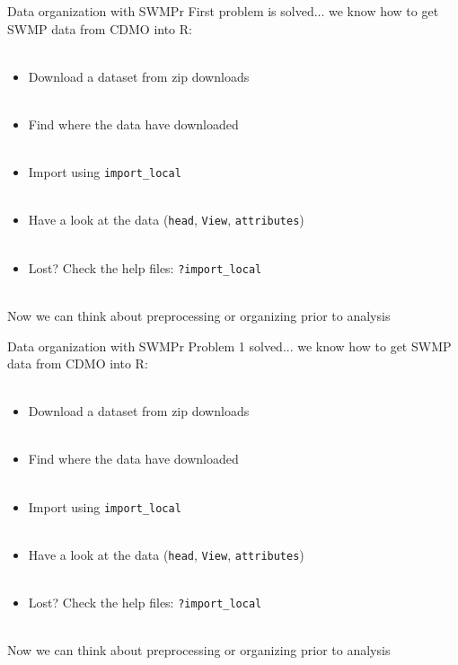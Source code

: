 \documentclass[xcolor=dvipsnames]{beamer}\usepackage[]{graphicx}\usepackage[]{color}
\begin{document}
\begin{frame}[fragile]{Data organization with SWMPr}
First problem is solved... we know how to get SWMP data from CDMO into R: \\~\\
\begin{itemize}
\item Download a dataset from zip downloads \\~\\
\item Find where the data have downloaded \\~\\
\item Import using \texttt{import_local} \\~\\
\item Have a look at the data (\texttt{head}, \texttt{View}, \texttt{attributes}) \\~\\
\item Lost? Check the help files: \texttt{?import\_local}\\~\\
\end{itemize}
Now we can think about preprocessing or organizing prior to analysis
\end{frame}

\begin{frame}[fragile]{Data organization with SWMPr}
Problem 1 solved... we know how to get SWMP data from CDMO into R: \\~\\
\begin{itemize}
\item Download a dataset from zip downloads \\~\\
\item Find where the data have downloaded \\~\\
\item Import using \texttt{import_local} \\~\\
\item Have a look at the data (\texttt{head}, \texttt{View}, \texttt{attributes}) \\~\\
\item Lost? Check the help files: \texttt{?import\_local}\\~\\
\end{itemize}
Now we can think about preprocessing or organizing prior to analysis
\end{frame}
\end{document}
